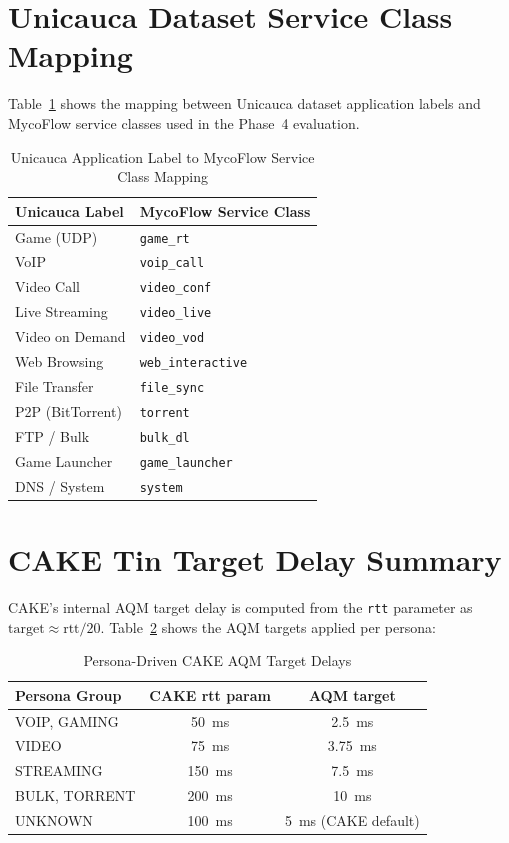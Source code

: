 \section{Unicauca Dataset Service Class Mapping}

Table~\ref{tab:unicauca_map} shows the mapping between Unicauca dataset application labels and MycoFlow service classes used in the Phase~4 evaluation.

\begin{table}[h]
\caption{Unicauca Application Label to MycoFlow Service Class Mapping}
\label{tab:unicauca_map}
\centering
\small
\begin{tabular}{ll}
\toprule
\textbf{Unicauca Label} & \textbf{MycoFlow Service Class} \\
\midrule
Game (UDP)     & \texttt{game\_rt} \\
VoIP           & \texttt{voip\_call} \\
Video Call     & \texttt{video\_conf} \\
Live Streaming & \texttt{video\_live} \\
Video on Demand & \texttt{video\_vod} \\
Web Browsing   & \texttt{web\_interactive} \\
File Transfer  & \texttt{file\_sync} \\
P2P (BitTorrent) & \texttt{torrent} \\
FTP / Bulk     & \texttt{bulk\_dl} \\
Game Launcher  & \texttt{game\_launcher} \\
DNS / System   & \texttt{system} \\
\bottomrule
\end{tabular}
\end{table}

\section{CAKE Tin Target Delay Summary}

CAKE's internal AQM target delay is computed from the \texttt{rtt} parameter as $\text{target} \approx \text{rtt}/20$. Table~\ref{tab:cake_targets} shows the AQM targets applied per persona:

\begin{table}[h]
\caption{Persona-Driven CAKE AQM Target Delays}
\label{tab:cake_targets}
\centering
\small
\begin{tabular}{lcc}
\toprule
\textbf{Persona Group} & \textbf{CAKE rtt param} & \textbf{AQM target} \\
\midrule
VOIP, GAMING    & 50~ms  & 2.5~ms \\
VIDEO           & 75~ms  & 3.75~ms \\
STREAMING       & 150~ms & 7.5~ms \\
BULK, TORRENT   & 200~ms & 10~ms \\
UNKNOWN         & 100~ms & 5~ms (CAKE default) \\
\bottomrule
\end{tabular}
\end{table}

